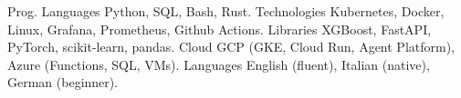 
\begin{cvskills}
  \cvskill
    {Prog. Languages}
    {Python, SQL, Bash, Rust.}
  \cvskill
    {Technologies}
    {Kubernetes, Docker, Linux, Grafana, Prometheus, Github Actions.}
  \cvskill
    {Libraries}
    {XGBoost, FastAPI, PyTorch, scikit-learn, pandas.}
  \cvskill
    {Cloud}
    {GCP (GKE, Cloud Run, Agent Platform), Azure (Functions, SQL, VMs).}
  \cvskill
    {Languages}
    {English (fluent), Italian (native), German (beginner).}
\end{cvskills}
